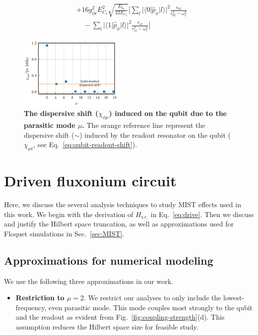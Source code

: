 \documentclass[%
reprint,
superscriptaddress,
 amsmath,amssymb,
 aps,
 prx,
longbibliography,
floatfix,
]{revtex4-2}
\begin{document}
{\begin{align}
   &+16g_{\phi\textrm{r}}^2E_{C_\textrm{r}}^2\sqrt{\frac{E_{\textrm{L}_\textrm{r}}}{32E_{C_\textrm{r}}}}\Bigg[\sum_l|\langle 0|\hat p_\phi|l \rangle|^2\frac{\epsilon_{0l}}{\epsilon_{0l}^2-\omega_\textrm{r}^2}\nonumber\\&\quad-\sum_l|\langle 1|\hat p_\phi|l \rangle|^2\frac{\epsilon_{1l}}{\epsilon_{1l}^2-\omega_\textrm{r}^2}\Bigg]\label{eq:qubit-readout-shift}
\end{align}
\begin{figure}[t]
    \centering
    \includegraphics[width=0.45\textwidth]{Supp_Fig/dispersive_shift.pdf}
    \caption{ {\bf The dispersive shift ($\chi_{\phi\mu}$) induced on the qubit due to the parasitic mode $\mu$.} The orange reference line represent the dispersive shift ($\sim $) induced by the readout resonator on the qubit ($\chi_{\mu\textrm{r}}$, see Eq.~\ref{eq:qubit-readout-shift}).}
    \label{fig:dispersive-shift}
\end{figure}

\section{Driven fluxonium circuit}\label{app:MIST}
Here, we discuss the several analysis techniques to study MIST effects used in this work. We begin with the derivation of $H_\textrm{s.c.}$ in Eq.~\ref{eq:drive}. Then we discuss and justify the Hilbert space truncation, as well as approximations used for Floquet simulations in Sec.~\ref{sec:MIST}.
\subsection{Approximations for numerical modeling}\label{app:numerics}
We use the following three approximations in our work.
\begin{itemize}
    \item \textbf{Restriction to $\mu=2$}. We restrict our analyses to only include the lowest-frequency, even parasitic mode. This mode couples most strongly to the qubit and the readout as evident from Fig.~\ref{fig:coupling-strength}(d). This assumption reduces the Hilbert space size for feasible study. 


\end{itemize}}
\end{document}
